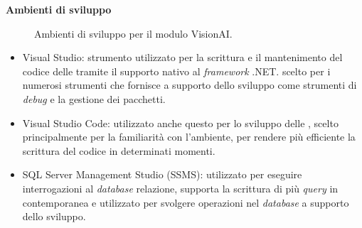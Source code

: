 \textbf{Ambienti di sviluppo}
\begin{figure}[H]
\centering
{}
\caption{Ambienti di sviluppo per il modulo VisionAI.}
\label{img:sviluppo}
\end{figure}

\begin{itemize}
    \item Visual Studio: strumento utilizzato per la scrittura e il mantenimento del codice delle  tramite il supporto nativo al \textit{framework} .NET. scelto per i numerosi strumenti che fornisce a supporto dello sviluppo come strumenti di \textit{debug} e la gestione dei pacchetti.
    \item Visual Studio Code: utilizzato anche questo per lo sviluppo delle , scelto principalmente per la familiarità con l'ambiente, per rendere più efficiente la scrittura del codice in determinati momenti.
    \item SQL Server Management Studio (SSMS): utilizzato per eseguire interrogazioni al \textit{database} relazione, supporta la scrittura di più \textit{query} in contemporanea e utilizzato per svolgere operazioni nel \textit{database} a supporto dello sviluppo.
\end{itemize}

